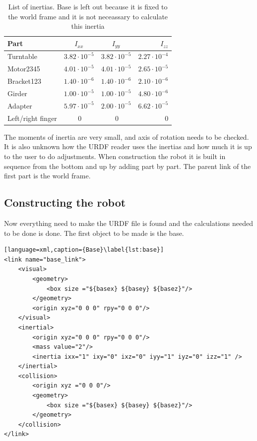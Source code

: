 \begin{table}[htbp]
\centering
\caption{List of inertias. Base is left out because it is fixed to the world frame and it is not neceassary to calculate this inertia}
\label{table:inertia}
    \begin{tabular}{l c c r}
        \toprule
        Part  &  $I_{xx}$ & $I_{yy}$ & $I_{zz}$\\
        \midrule
        Turntable & $3.82\cdot10^{-5}$ &  $3.82\cdot10^{-5}$ &$2.27\cdot10^{-4}$\\
        Motor2345 & $4.01\cdot10^{-5}$  & $4.01\cdot10^{-5}$  & $2.65\cdot10^{-5}$ \\
        Bracket123 & $1.40\cdot10^{-6} $ & $1.40\cdot10^{-6} $ & $2.10\cdot10^{-6} $ \\
        Girder & $1.00\cdot10^{-5} $ & $1.00\cdot10^{-5} $ & $4.80\cdot10^{-6} $\\
        Adapter & $5.97\cdot10^{-5} $ & $2.00\cdot10^{-5} $ & $6.62\cdot10^{-5} $\\
        Left/right finger & $~0$ & $~0$ & $~0$\\
        \bottomrule
    \end{tabular}
\end{table}

The moments of inertia are very small, and axis of rotation needs to be checked. It is also unknown how the URDF reader uses the inertias and how much it is up to the user to do adjustments. When construction the robot it is built in sequence from the bottom and up by adding part by part. The parent link of the first part is the world frame.

\subsection*{Constructing the robot}\label{sec:makingurdf}
Now everything need to make the URDF file is found and the calculations needed to be done is done. The first object to be made is the base. 

\begin{lstlisting}[language=xml,caption={Base}\label{lst:base}]
<link name="base_link">
    <visual>
        <geometry>
            <box size ="${basex} ${basey} ${basez}"/>
        </geometry>
        <origin xyz="0 0 0" rpy="0 0 0"/>
    </visual>
    <inertial>
        <origin xyz="0 0 0" rpy="0 0 0"/>
        <mass value="2"/>
        <inertia ixx="1" ixy="0" ixz="0" iyy="1" iyz="0" izz="1" />
    </inertial>
    <collision>
        <origin xyz ="0 0 0"/>
        <geometry>
            <box size ="${basex} ${basey} ${basez}"/>
        </geometry>
    </collision>
</link>
\end{lstlisting}

